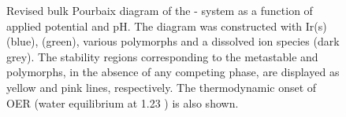 \begin{figure}[!htb]
\centering
{}
\caption{\label{fig:bulk_pourbaix}
%
Revised bulk Pourbaix diagram of the - system as a function of applied potential and pH.
%
The diagram was constructed with Ir(s) (blue), \rIrOtwo (green), various \IrOthree polymorphs and a dissolved  ion species (dark grey).
%
The stability regions corresponding to the metastable \rIrOthree and \bIrOthree polymorphs, in the absence of any competing \IrOthree phase, are displayed as yellow and pink lines, respectively.
%
The thermodynamic onset of OER (water equilibrium at \num{1.23} \VRHE) is also shown.
%
%
}
\end{figure}


